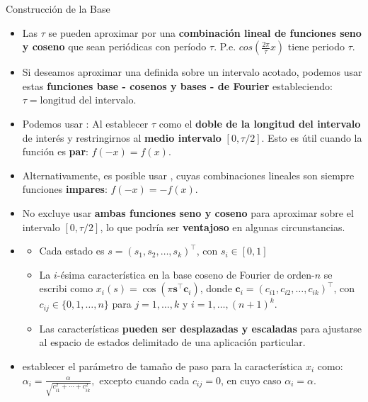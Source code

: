 \documentclass[10pt, envcountsect, handout, aspectratio=1610, hyperref={hypertexnames=true}]{beamer}
\begin{document}
\begin{frame}{Construcción de la Base}
	
	\begin{itemize}
		\item Las  $\tau$ se pueden aproximar por una \textbf{combinación lineal de funciones seno y coseno} que sean periódicas con período \(\tau\).  P.e. $cos\left(\frac{2\pi}{\tau} x\right)$ tiene periodo $\tau$.

		\item Si deseamos aproximar una  definida sobre un intervalo acotado, podemos usar estas \textbf{funciones base - cosenos y bases - de Fourier} estableciendo:
		$
		\tau = \text{longitud del intervalo.}
		$

		
		\item Podemos usar : Al establecer \(\tau\) como el \textbf{doble de la longitud del intervalo} de interés y restringirnos al \textbf{medio intervalo} \([0, \tau/2]\).  Esto es útil cuando la función es \textbf{par}:
			$
			f(-x) = f(x).
			$

		
		\item Alternativamente, es posible usar , cuyas combinaciones lineales son siempre funciones \textbf{impares}:
		$
		f(-x) = -f(x)
		$.
		
		
		\item No excluye usar \textbf{ambas funciones seno y coseno} para aproximar sobre el intervalo \([0, \tau/2]\), lo que podría ser \textbf{ventajoso} en algunas circunstancias.
		
		\item {}
		
		\begin{itemize}
			\item  Cada estado es \(s = (s_1, s_2, \ldots, s_k)^\top\), con  \(s_i \in [0, 1]\)
			\item La \(i\)-ésima característica en la base coseno de Fourier de orden-\(n\) se escribi como $x_i(s) = \cos\left( \pi \mathbf{s}^\top \mathbf{c}_i \right)$, donde  \(\mathbf{c}_i = (c_{i1}, c_{i2}, \ldots, c_{ik})^\top\), con \(c_{ij} \in \{0, 1, \ldots, n\}\) para \(j = 1, \ldots, k\) y \(i = 1, \ldots, (n+1)^k\).
			\item Las características \textbf{pueden ser desplazadas y escaladas} para ajustarse al espacio de estados delimitado de una aplicación particular.
		\end{itemize}
		
		\item {} establecer el parámetro de tamaño de paso para la característica \(x_i\) como:
		$
		\alpha_i = \frac{\alpha}{\sqrt{c_{i1}^2 + \cdots + c_{ik}^2}},
		$
		excepto cuando cada \(c_{ij} = 0\), en cuyo caso \(\alpha_i = \alpha\).
		
	\end{itemize}		

\end{frame}
\end{document}
